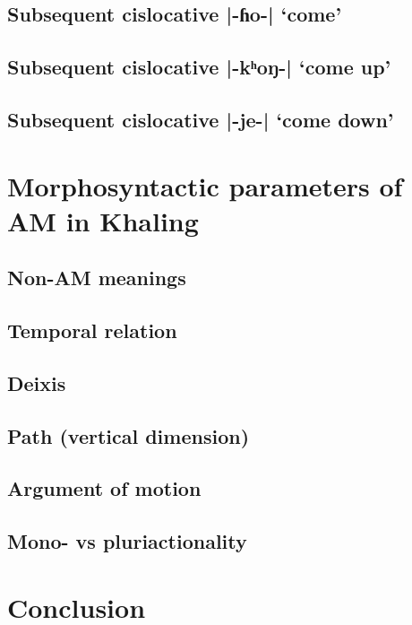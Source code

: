 \documentclass[oneside,a4paper,11pt]{article}
\newcommand{\ipa}[1]{{\phon#1}}
\newcommand{\dhatu}[2]{|\ipa{#1}| `#2'}
\begin{document}
\subsection{Subsequent cislocative \dhatu{-ɦo-}{come}} \label{sec:v2.ho}
\subsection{Subsequent cislocative \dhatu{-kʰoŋ-}{come up}} \label{sec:v2.khoN}
\subsection{Subsequent cislocative \dhatu{-je-}{come down}} \label{sec:v2.je}

\section{Morphosyntactic parameters of AM in Khaling}
\subsection{Non-AM meanings}
\subsection{Temporal relation}
\subsection{Deixis}
\subsection{Path (vertical dimension)}
\subsection{Argument of motion}
\subsection{Mono- vs pluriactionality}

\section{Conclusion}



\end{document}
